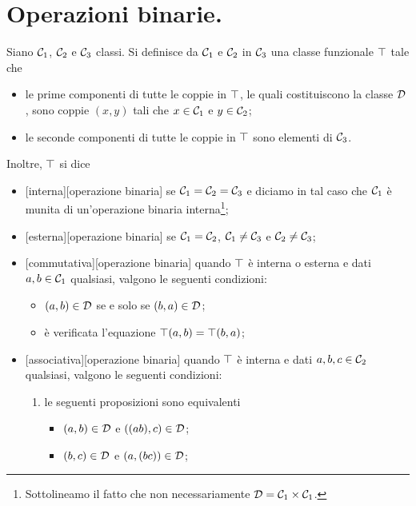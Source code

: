 \section{Operazioni binarie.}\label{OperazioniBinarie}
\begin{Definition}
	Siano $\mathcal{C}_1$, $\mathcal{C}_2$ e $\mathcal{C}_3$ classi. Si definisce  da $\mathcal{C}_1$ e $\mathcal{C}_2$ in $\mathcal{C}_3$ una classe funzionale $\top$ tale che
	\begin{itemize}
		\item le prime componenti di tutte le coppie in $\top$, le quali costituiscono la classe $\mathcal{D}$, sono coppie $(x,y)$ tali che $x \in \mathcal{C}_1$ e $y \in \mathcal{C}_2$;
		\item le seconde componenti di tutte le coppie in $\top$ sono elementi di $\mathcal{C}_3$.
	\end{itemize}
	\par Inoltre, $\top$ si dice
	\begin{itemize}
		\item {}[interna][operazione binaria] se $\mathcal{C}_1 = \mathcal{C}_2 = \mathcal{C}_3$ e diciamo in tal caso che $\mathcal{C}_1$ \`e munita di un'operazione binaria interna\footnote{Sottolineamo il fatto che non necessariamente $\mathcal{D} = \mathcal{C}_1 \times \mathcal{C}_1$.};
		\item {}[esterna][operazione binaria] se $\mathcal{C}_1 = \mathcal{C}_2$, $\mathcal{C}_1 \neq \mathcal{C}_3$ e $\mathcal{C}_2 \neq \mathcal{C}_3$;
		\item {}[commutativa][operazione binaria] quando $\top$ \`e interna o esterna e dati $a, b \in \mathcal{C}_1$ qualsiasi, valgono le seguenti condizioni:
		\begin{itemize}
			\item $(a,b) \in \mathcal{D}$ se e solo se $(b,a) \in \mathcal{D}$;
			\item \`e verificata l'equazione $\top(a,b) = \top(b,a)$;
		\end{itemize}
		\item {}[associativa][operazione binaria] quando $\top$ \`e interna e dati $a,b,c \in \mathcal{C}_2$ qualsiasi, valgono le seguenti condizioni:
		\begin{enumerate}
			\item le seguenti proposizioni sono equivalenti
			\begin{itemize}
				\item $(a,b) \in \mathcal{D}$ e $((ab),c) \in \mathcal{D}$;
				\item $(b,c) \in \mathcal{D}$ e $(a,(bc)) \in \mathcal{D}$;

\end{itemize}
\end{enumerate}
\end{itemize}
\end{Definition}
